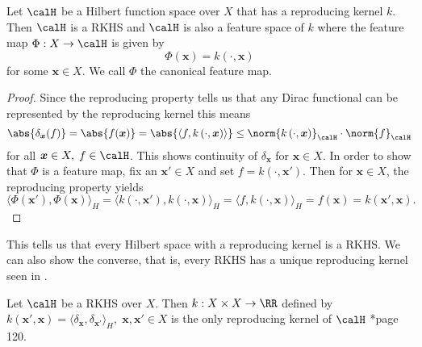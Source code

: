 \begin{lem}[] \label{lem: RKHS_rk_k}
    Let $\calH$ be a Hilbert function space over $X$ that has a reproducing kernel $k$. Then $\calH$ is a RKHS and $\calH$ is also a feature space of $k$ where the feature map $\Phi : X \to \calH$ is given by
    \[
        \Phi (\bm{x}) = k \left( \cdot , \bm{x}  \right)
    \]
    for some $\bm{x} \in X$. We call $\Phi$ the canonical feature map.
\end{lem}

\begin{proof}
    Since the reproducing property tells us that any Dirac functional can be represented by the reproducing kernel this means
    \[
        \abs{\delta_{\bm{x}} (f)} = \abs{f(\bm{x})} = \abs{\langle f , k \left( \cdot, \bm{x} \right) \rangle} \leq \norm{k \left( \cdot, \bm{x} \right)}_{\calH} \cdot \norm{f}_{\calH}
    \]
    for all $\bm{x} \in X, \; f \in \calH$. This shows continuity of $\delta_{\bm{x}}$ for $\bm{x} \in X$. In order to show that $\Phi$ is a feature map, fix an $\bm{x}' \in X$ and set $f = k \left( \cdot, \bm{x}' \right)$. Then for $\bm{x} \in X$, the reproducing property yields
    \[
        \langle \Phi (\bm{x}') , \Phi (\bm{x}) \rangle_H = \langle k \left( \cdot, \bm{x}' \right) , k \left( \cdot, \bm{x} \right) \rangle_H = \langle f , k \left( \cdot, \bm{x} \right) \rangle_H = f(\bm{x}) = k \left( \bm{x}', \bm{x} \right).
    \]
\end{proof}

This tells us that every Hilbert space with a reproducing kernel is a RKHS. We can also show the converse, that is, every RKHS has a unique reproducing kernel seen in .

\begin{thm} \label{theorem: unique_kernel}
    Let $\calH$ be a RKHS over $X$. Then $k: X \times X \to \RR$ defined by $k \left( \bm{x}', \bm{x} \right) = \langle \delta_{\bm{x}} , \delta_{\bm{x}'} \rangle_H, \; \bm{x} , \bm{x}' \in X$ is the only reproducing kernel of $\calH$ \cite{SteinwartIngo2008SVMb}*{page 120}.
\end{thm}

